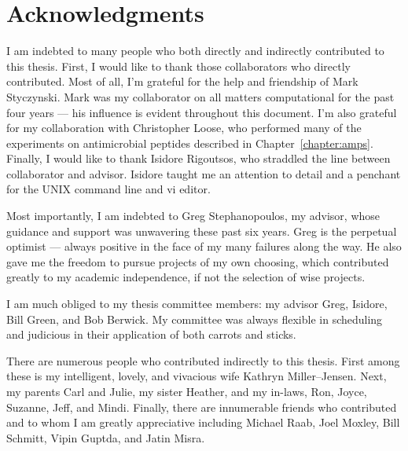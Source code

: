 \cleardoublepage

\section*{Acknowledgments}


I am indebted to many people who both directly and indirectly
contributed to this thesis.  First, I would like to thank those
collaborators who directly contributed.  Most of all, I'm grateful
for the help and friendship of Mark Styczynski. Mark was my
collaborator on all matters computational for the past four years
--- his influence is evident throughout this document.  I'm also
grateful for my collaboration with Christopher Loose, who performed
many of the experiments on antimicrobial peptides described in
Chapter~\ref{chapter:amps}.  Finally, I would like to thank Isidore Rigoutsos, who
straddled the line between collaborator and advisor.  Isidore taught
me an attention to detail and a penchant for the UNIX command line
and vi editor.

Most importantly, I am indebted to Greg Stephanopoulos, my advisor,
whose guidance and support was unwavering these past six years. Greg
is the perpetual optimist --- always positive in the face of my many
failures along the way.  He also gave me the freedom to pursue
projects of my own choosing, which contributed greatly to my
academic independence, if not the selection of wise projects.

I am much obliged to my thesis committee members: my advisor Greg,
Isidore, Bill Green, and Bob Berwick.  My committee was always
flexible in scheduling and judicious in their application of both
carrots and sticks.

There are numerous people who contributed indirectly to this thesis.
First among these is my intelligent, lovely, and vivacious wife
Kathryn Miller--Jensen.  Next, my parents Carl and Julie, my sister
Heather, and my in-laws, Ron, Joyce, Suzanne, Jeff, and Mindi.
Finally, there are innumerable friends who contributed and to whom I
am greatly appreciative including Michael Raab, Joel Moxley, Bill
Schmitt, Vipin Guptda, and Jatin Misra.


